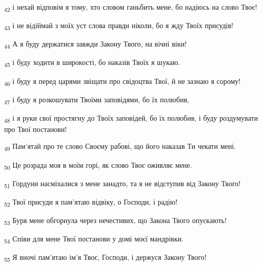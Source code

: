 \begin{tcolorbox}
\textsubscript{42} і нехай відповім я тому, хто словом ганьбить мене, бо надіюсь на слово Твоє!
\end{tcolorbox}
\begin{tcolorbox}
\textsubscript{43} і не відіймай з моїх уст слова правди ніколи, бо я жду Твоїх присудів!
\end{tcolorbox}
\begin{tcolorbox}
\textsubscript{44} А я буду держатися завжди Закону Твого, на вічні віки!
\end{tcolorbox}
\begin{tcolorbox}
\textsubscript{45} і буду ходити в широкості, бо наказів Твоїх я шукаю.
\end{tcolorbox}
\begin{tcolorbox}
\textsubscript{46} і буду я перед царями звіщати про свідоцтва Твої, й не зазнаю я сорому!
\end{tcolorbox}
\begin{tcolorbox}
\textsubscript{47} і буду я розкошувати Твоїми заповідями, бо їх полюбив,
\end{tcolorbox}
\begin{tcolorbox}
\textsubscript{48} і я руки свої простягну до Твоїх заповідей, бо їх полюбив, і буду роздумувати про Твої постанови!
\end{tcolorbox}
\begin{tcolorbox}
\textsubscript{49} Пам'ятай про те слово Своєму рабові, що його наказав Ти чекати мені.
\end{tcolorbox}
\begin{tcolorbox}
\textsubscript{50} Це розрада моя в моїм горі, як слово Твоє оживляє мене.
\end{tcolorbox}
\begin{tcolorbox}
\textsubscript{51} Гордуни насміхалися з мене занадто, та я не відступив від Закону Твого!
\end{tcolorbox}
\begin{tcolorbox}
\textsubscript{52} Твої присуди я пам'ятаю відвіку, о Господи, і радію!
\end{tcolorbox}
\begin{tcolorbox}
\textsubscript{53} Буря мене обгорнула через нечестивих, що Закона Твого опускають!
\end{tcolorbox}
\begin{tcolorbox}
\textsubscript{54} Співи для мене Твої постанови у домі моєї мандрівки.
\end{tcolorbox}
\begin{tcolorbox}
\textsubscript{55} Я вночі пам'ятаю ім'я Твоє, Господи, і держуся Закону Твого!
\end{tcolorbox}
